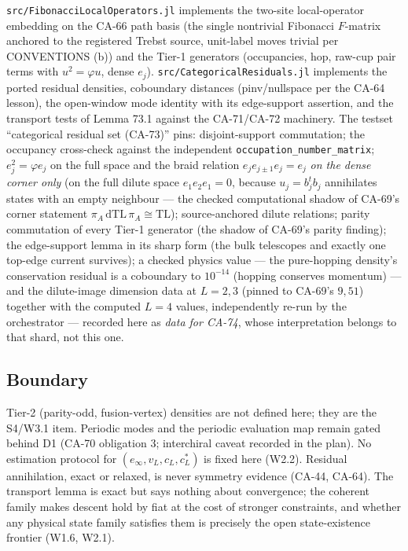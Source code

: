 \texttt{src/FibonacciLocalOperators.jl} implements the two-site
local-operator embedding on the CA-66 path basis (the single nontrivial
Fibonacci \(F\)-matrix anchored to the registered Trebst source, unit-label
moves trivial per CONVENTIONS (b)) and the Tier-1 generators (occupancies,
hop, raw-cup pair terms with \(u^2=\varphi u\), dense \(e_j\)).
\texttt{src/CategoricalResiduals.jl} implements the ported residual
densities, coboundary distances (pinv/nullspace per the CA-64 lesson), the
open-window mode identity with its edge-support assertion, and the
transport tests of Lemma 73.1 against the CA-71/CA-72 machinery.  The
testset ``categorical residual set (CA-73)'' pins: disjoint-support
commutation; the occupancy cross-check against the independent
\texttt{occupation\_number\_matrix}; \(e_j^2=\varphi e_j\) on the full
space and the braid relation \(e_je_{j\pm1}e_j=e_j\) \emph{on the dense
corner only} (on the full dilute space \(e_1e_2e_1=0\), because
\(u_j=b_j^tb_j\) annihilates states with an empty neighbour --- the checked
computational shadow of CA-69's corner statement
\(\pi_A\,\mathrm{dTL}\,\pi_A\cong\mathrm{TL}\)); source-anchored dilute
relations; parity commutation of every Tier-1 generator (the shadow of
CA-69's parity finding); the edge-support lemma in its sharp form (the bulk
telescopes and exactly one top-edge current survives); a checked physics
value --- the pure-hopping density's conservation residual is a coboundary
to \(10^{-14}\) (hopping conserves momentum) --- and the dilute-image
dimension data at \(L=2,3\) (pinned to CA-69's \(9,51\)) together with the
computed \(L=4\) values, independently re-run by the orchestrator ---
recorded here as \emph{data for CA-74}, whose interpretation belongs to
that shard, not this one.

\subsection{Boundary}

Tier-2 (parity-odd, fusion-vertex) densities are not defined here; they are
the S4/W3.1 item.  Periodic modes and the periodic evaluation map remain
gated behind D1 (CA-70 obligation 3; interchiral caveat recorded in the
plan).  No estimation protocol for \((e_\infty,v_L,c_L,c^*_L)\) is fixed
here (W2.2).  Residual annihilation, exact or relaxed, is never symmetry
evidence (CA-44, CA-64).  The transport lemma is exact but says nothing
about convergence; the coherent family makes descent hold by fiat at the
cost of stronger constraints, and whether any physical state family
satisfies them is precisely the open state-existence frontier (W1.6, W2.1).

